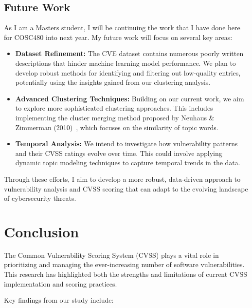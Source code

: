 \documentclass[12pt]{article}
\begin{document}
\subsection{Future Work}

As I am a Masters student, I will be continuing the work that I have done here for COSC480 into next
year. My future work will focus on several key areas:

\begin{itemize}

	\item \textbf{Dataset Refinement:} The CVE dataset contains numerous poorly written descriptions
	      that hinder machine learning model performance. We plan to develop robust methods for
	      identifying and filtering out low-quality entries, potentially using the insights gained
	      from our clustering analysis.

	\item \textbf{Advanced Clustering Techniques:} Building on our current work, we aim to explore
	      more sophisticated clustering approaches. This includes implementing the cluster merging
	      method proposed by Neuhaus \& Zimmerman (2010)~\cite{cve_topic_modelling}, which focuses on
	      the similarity of topic words.

	\item \textbf{Temporal Analysis:} We intend to investigate how vulnerability patterns and their
	      CVSS ratings evolve over time. This could involve applying dynamic topic modeling techniques
	      to capture temporal trends in the data.

\end{itemize}

Through these efforts, I aim to develop a more robust, data-driven approach to vulnerability
analysis and CVSS scoring that can adapt to the evolving landscape of cybersecurity threats.

\section{Conclusion}

The Common Vulnerability Scoring System (CVSS) plays a vital role in prioritizing and managing the
ever-increasing number of software vulnerabilities. This research has highlighted both the strengths
and limitations of current CVSS implementation and scoring practices.

Key findings from our study include:
\end{document}
